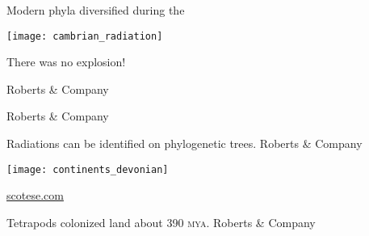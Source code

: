 \documentclass[t]{beamer}
\begin{document}
\begin{frame}{Modern phyla diversified during the  }

	\texttt{[image: cambrian\_radiation]}
	
	\hangpara There was no explosion!

	\vfilll
	
	\hfill \tiny \textcopyright Roberts \& Company

\end{frame}
%
{
\begin{frame}[b]
\hfill \tiny \textcopyright Roberts \& Company
\end{frame}
}
%
{
\begin{frame}[b]{Radiations can be identified on phylogenetic trees.}
\hfill \tiny \textcopyright Roberts \& Company
\end{frame}
}
%
{
\begin{frame}[t]
	\texttt{[image: continents\_devonian]}
	
	\vfilll
	
	\hfill \tiny \textcolor{white}{\href{http://scotese.com}{scotese.com}}
\end{frame}
}
%

{
\begin{frame}[b]{Tetrapods colonized land about 390 \textsc{mya}.}
\hfill \tiny \textcopyright Roberts \& Company
\end{frame}
}
\end{document}

